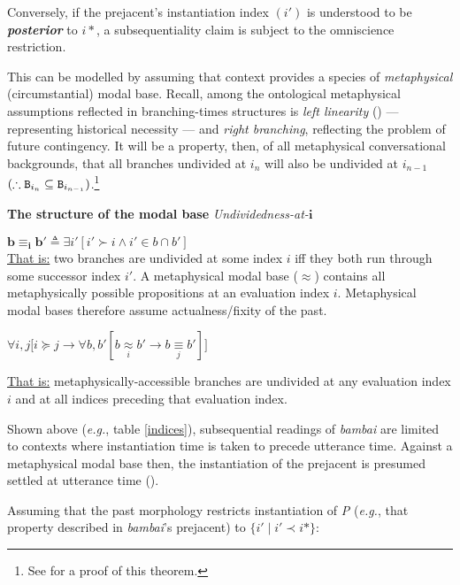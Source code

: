Conversely, if the prejacent's instantiation index $( i' )$ is understood to be \textbf{\textit{posterior }}to $ i* $, a subsequentiality claim is subject to the omniscience restriction.

This can be modelled by assuming that context provides a species of \textit{metaphysical} (circumstantial) modal base. Recall, among the ontological metaphysical assumptions reflected in branching-times structures is \textit{left linearity} () --- representing historical necessity --- and \textit{right branching}, reflecting the problem of future contingency. It will be a property, then, of all metaphysical conversational backgrounds, that all branches undivided at $ i_n $ will also be undivided at $ i_{n-1} $ ${(\therefore\mathtt{B_\mathnormal{i_n}\subseteq B_{\mathnormal{i_{n-1}}}})}$.\footnote{See \citet[79-80]{Rumberg2016a} for a proof of this theorem.}

\pex \textbf{The structure of the modal base}
\a \textit{Undividedness-at-$ \boldsymbol i $} 

$\boldsymbol{ b \equiv_i b' }\triangleq \exists i'[i'\succ i\wedge i'\in b\cap b']$\\
\ul{That is:} two branches are undivided at some index $ i $ iff they both run through some successor index $ i' $.
\a A metaphysical modal base ($ \boldsymbol{\approx} $) contains all metaphysically possible propositions at an evaluation index $ i $.
\a Metaphysical modal bases therefore assume actualness/fixity of the past. 

$ \forall i,j\big[i\succcurlyeq j\to\forall b,b'[b\underset{i}{\approx} b'\to b\underset{j}{\equiv} b']\big] $

\ul{That is:} metaphysically-accessible branches are undivided at any evaluation index $ i $ and at all indices preceding that evaluation index.
\xe

Shown above (\textit{e.g.}, table \ref{indices}), subsequential readings of \textit{bambai} are limited to contexts where instantiation time is taken to precede utterance time. Against a metaphysical modal base then, the instantiation of the prejacent is presumed settled at utterance time (\nextx).

\pex Assuming that the past morphology restricts instantiation of \textit{P} (\textit{e.g.}, that property described in \textit{bambai}'s prejacent) to $ \{i'\mid i'\prec i*\} $:

